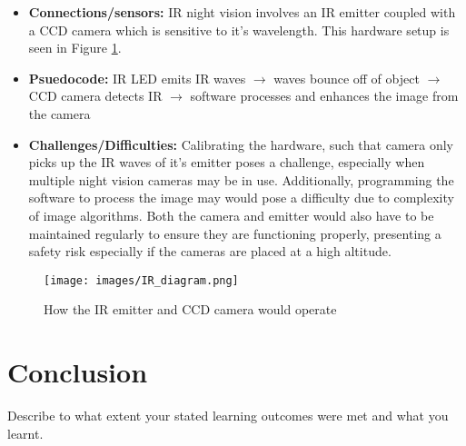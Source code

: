 \documentclass[journal]{IEEEtran}
\begin{document}
\begin{itemize}
  \item {\textbf{Connections/sensors:} IR night vision involves an IR emitter coupled with a CCD camera which is sensitive to it's wavelength. This hardware setup is seen in Figure \ref{fig:IR camera}.}
  \item {\textbf{Psuedocode:} IR LED emits IR waves $\rightarrow$ waves bounce off of object $\rightarrow$ CCD camera detects IR $\rightarrow$ software processes and enhances the image from the camera}
  \item {\textbf{Challenges/Difficulties:} Calibrating the hardware, such that camera only picks up the IR waves of it's emitter poses a challenge, especially when multiple night vision cameras may be in use. Additionally, programming the software to process the image may would pose a difficulty due to complexity of image algorithms. Both the camera and emitter would also have to be maintained regularly to ensure they are functioning properly, presenting a safety risk especially if the cameras are placed at a high altitude.}
\end{itemize}
\begin{figure}[ht]
  \centering
  \texttt{[image: images/IR\_diagram.png]}
  \caption{How the IR emitter and CCD camera would operate}
  \label{fig:IR camera}
\end{figure}

\section{Conclusion}
Describe to what extent your stated learning outcomes were met and what you learnt.



\end{document}
